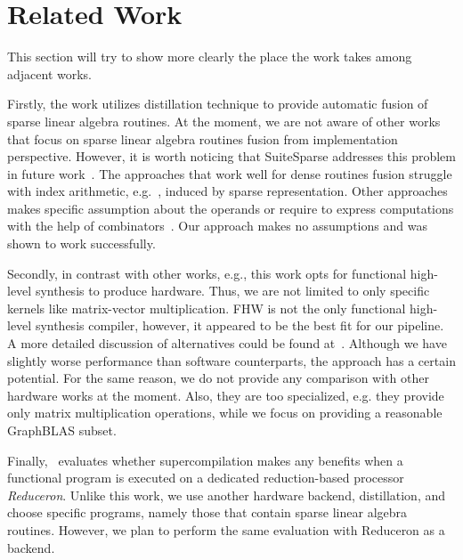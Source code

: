 \section{Related Work}

This section will try to show more clearly the place the work takes among adjacent works.

Firstly, the work utilizes distillation technique to provide automatic fusion of sparse linear algebra routines. At the moment, we are not aware of other works that focus on sparse linear algebra routines fusion from implementation perspective. However, it is worth noticing that SuiteSparse addresses this problem in future work~\cite{newsuitesparse}. The approaches that work well for dense routines fusion struggle with index arithmetic, e.g.~\cite{Futhark}, induced by sparse representation. Other approaches makes specific assumption about the operands or require to express computations with the help of combinators~\cite{StreamFus}. Our approach makes no assumptions and was shown to work successfully.

Secondly, in contrast with other works, e.g.\cite{zhang2020sparch}, this work opts for functional high-level synthesis to produce hardware. Thus, we are not limited to only specific kernels like matrix-vector multiplication. FHW is not the only functional high-level synthesis compiler, however, it appeared to be the best fit for our pipeline. A more detailed discussion of alternatives could be found at~\cite{Edwards2019FHWP}. Although we have slightly worse performance than software counterparts, the approach has a certain potential. For the same reason, we do not provide any comparison with other hardware works at the moment. Also, they are too specialized, e.g. they provide only matrix multiplication operations, while we focus on providing a reasonable GraphBLAS subset.

Finally,~\cite{superreduceron} evaluates whether supercompilation makes any benefits when a functional program is executed on a dedicated reduction-based processor \textit{Reduceron}. Unlike this work, we use another hardware backend, distillation, and choose specific programs, namely those that contain sparse linear algebra routines. However, we plan to perform the same evaluation with Reduceron as a backend.